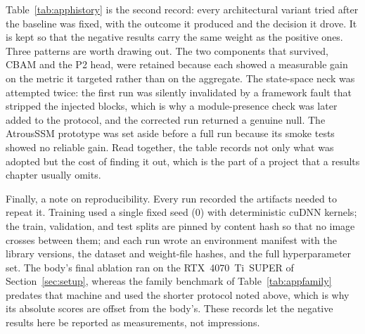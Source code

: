 \documentclass[12pt,a4paper,oneside]{report}
\begin{document}
Table~\ref{tab:apphistory} is the second record: every architectural variant
tried after the baseline was fixed, with the outcome it produced and the
decision it drove. It is kept so that the negative results carry the same weight
as the positive ones. Three patterns are worth drawing out. The two components
that survived, CBAM and the P2 head, were retained because each showed a
measurable gain on the metric it targeted rather than on the aggregate. The
state-space neck was attempted twice: the first run was silently invalidated by
a framework fault that stripped the injected blocks, which is why a
module-presence check was later added to the protocol, and the corrected run
returned a genuine null. The AtrousSSM prototype was set aside before a full run
because its smoke tests showed no reliable gain. Read together, the table
records not only what was adopted but the cost of finding it out, which is the
part of a project that a results chapter usually omits.

Finally, a note on reproducibility. Every run recorded the artifacts needed to
repeat it. Training used a single fixed seed (0) with deterministic cuDNN
kernels; the train, validation, and test splits are pinned by content hash so
that no image crosses between them; and each run wrote an environment manifest
with the library versions, the dataset and weight-file hashes, and the full
hyperparameter set. The body's final ablation ran on the RTX~4070~Ti~SUPER of
Section~\ref{sec:setup}, whereas the family benchmark of
Table~\ref{tab:appfamily} predates that machine and used the shorter protocol
noted above, which is why its absolute scores are offset from the body's. These
records let the negative results here be reported as measurements, not
impressions.
\end{document}
